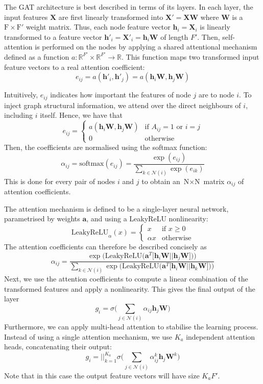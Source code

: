 \documentclass[12pt]{article}
\theoremstyle{definition}
\begin{document}
\bigskip

The GAT architecture is best described in terms of its layers. In each layer, the input features $\textbf{X}$ are first linearly transformed into $\textbf{X}' = \textbf{X}\textbf{W}$ where $\mathbf{W}$ is a $\textrm{F} \times \textrm{F}'$ weight matrix. Thus, each node feature vector $\mathbf{h}_i = \mathbf{X}_i$ is linearly transformed to a feature vector $\mathbf{h}'_i = \mathbf{X}'_i = \mathbf{h}_i \textbf{W}$ of length $F'$. Then, self-attention is performed on the nodes by applying a shared attentional mechanism defined as a function $a: \mathbb{R}^{F'} \times \mathbb{R}^{F'} \to \mathbb{R}$. This function maps two transformed input feature vectors to a real attention coefficient:
\[
e_{ij} = a(\mathbf{h}'_i, \mathbf{h}'_j) = a(\mathbf{h}_i \textbf{W}, \mathbf{h}_j \textbf{W})
\]

Intuitively, $e_{ij}$ indicates how important the features of node $j$ are to node $i$. To inject graph structural information, we attend over the direct neighbours of $i$, including $i$ itself. Hence, we have that
\begin{equation*}
e_{ij} = \begin{cases}
				a(\mathbf{h}_i \textbf{W}, \mathbf{h}_j \textbf{W}) &\text{if $A_{ij} = 1$ or $i = j$}\\
				0 &\text{otherwise}
			\end{cases}
\end{equation*}
Then, the coefficients are normalised using the softmax function:
\[
\alpha_{ij} = \textrm{softmax}(e_{ij}) = \frac{\exp(e_{ij})}{\sum_{k \in \mathcal{N}(i)} \exp(e_{ik})}
\]
This is done for every pair of nodes $i$ and $j$ to obtain an $\textrm{N} \times \textrm{N}$ matrix $\alpha_{ij}$ of attention coefficients.

\bigskip

The attention mechanism is defined to be a single-layer neural network, parametrised by weights $\textbf{a}$, and using a LeakyReLU nonlinearity: 
\[
\textrm{LeakyReLU}_{\alpha}(x) = 
	\begin{cases}
		x &\text{if $x \ge 0$}\\
		\alpha x &\text{otherwise}
	\end{cases}
\]
The attention coefficients can therefore be described concisely as
\[
\alpha_{ij} = \frac{\exp \big( \textrm{LeakyReLU}\big( \textbf{a}^T \big[ \mathbf{h}_i \textbf{W} \vert\vert \mathbf{h}_j \textbf{W} \big] \big) \big)}
{
\sum_{k \in \mathcal{N}(i)} \exp \big( \textrm{LeakyReLU}\big( \textbf{a}^T \big[ \mathbf{h}_i \textbf{W} \vert\vert \mathbf{h}_k \textbf{W} \big] \big) \big)
}
\]
Next, we use the attention coefficients to compute a linear combination of the transformed features and apply a nonlinearity. This gives the final output of the layer
\[
g_i = \sigma \big( \sum_{j \in \mathcal{N}(i)} \alpha_{ij} \mathbf{h}_j \textbf{W} \big)
\]
Furthermore, we can apply multi-head attention to stabilise the learning process. Instead of using a single attention mechanism, we use $K_a$ independent attention heads, concatenating their output:
\[
g_i = {\Big\vert\Big\vert}_{k=1}^{K_a} \sigma \big( \sum_{j \in \mathcal{N}(i)} \alpha_{ij}^k \mathbf{h}_j \textbf{W}^k \big)
\]
Note that in this case the output feature vectors will have size $K_a F'$.
\end{document}
